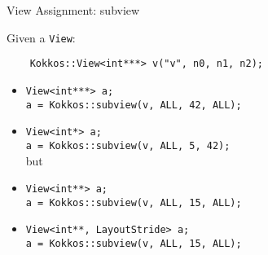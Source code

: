 \begin{frame}[fragile]{View Assignment: subview}

  {Given a \texttt{View}:}
  \vspace{-2pt}


  \begin{lstlisting}
    Kokkos::View<int***> v("v", n0, n1, n2);
  \end{lstlisting}
  \vspace{-5pt}
  \begin{itemize}
    \item{\texttt{View<int***> a;}\\
    \texttt{a = Kokkos::subview(v, ALL, 42, ALL);}}\\
    \pause
    {\color{darkred}{$=>$ Compilation error}}
    \pause
    \item{\texttt{View<int*> a;}\\
    \texttt{a = Kokkos::subview(v, ALL, 5, 42);}}\\
    \pause
    {\color{darkgreen}{$=>$ Okay for LayoutLeft}} but {\color{darkred}{$=>$ Compilation error for LayoutRight}}
    \pause
    \item{\texttt{View<int**> a;}\\
    \texttt{a = Kokkos::subview(v, ALL, 15, ALL);}}\\
    \pause
    {\color{darkred}{$=>$ Runtime error (!)}}
    \pause
    \item{\texttt{View<int**, LayoutStride> a;}\\
    \texttt{a = Kokkos::subview(v, ALL, 15, ALL);}}\\
    \pause
    {\color{darkgreen}{$=>$ Okay}}
  \end{itemize}

\end{frame}


